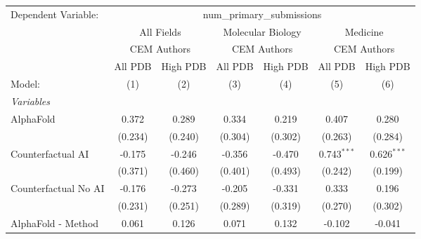 \begingroup
\centering
\begin{tabular}{lcccccc}
   \tabularnewline \midrule \midrule
   Dependent Variable: & \multicolumn{6}{c}{num\_primary\_submissions}\\
 & \multicolumn{2}{c}{All Fields} & \multicolumn{2}{c}{Molecular Biology} & \multicolumn{2}{c}{Medicine} \\
\cmidrule(lr){2-3} \cmidrule(lr){4-5} \cmidrule(lr){6-7}
 & \multicolumn{2}{c}{CEM Authors} & \multicolumn{2}{c}{CEM Authors} & \multicolumn{2}{c}{CEM Authors} \\
\cmidrule(lr){2-3} \cmidrule(lr){4-5} \cmidrule(lr){6-7}
 & \multicolumn{1}{c}{All PDB} & \multicolumn{1}{c}{High PDB} & \multicolumn{1}{c}{All PDB} & \multicolumn{1}{c}{High PDB} & \multicolumn{1}{c}{All PDB} & \multicolumn{1}{c}{High PDB} \\
\cmidrule(lr){2-2} \cmidrule(lr){3-3} \cmidrule(lr){4-4} \cmidrule(lr){5-5} \cmidrule(lr){6-6} \cmidrule(lr){7-7}
   Model:                                                     & (1)           & (2)           & (3)           & (4)           & (5)            & (6)\\  
   \midrule
   \emph{Variables}\\
   AlphaFold                                                  & 0.372         & 0.289         & 0.334         & 0.219         & 0.407          & 0.280\\   
                                                              & (0.234)       & (0.240)       & (0.304)       & (0.302)       & (0.263)        & (0.284)\\   
   Counterfactual AI                                          & -0.175        & -0.246        & -0.356        & -0.470        & 0.743$^{***}$  & 0.626$^{***}$\\   
                                                              & (0.371)       & (0.460)       & (0.401)       & (0.493)       & (0.242)        & (0.199)\\   
   Counterfactual No AI                                       & -0.176        & -0.273        & -0.205        & -0.331        & 0.333          & 0.196\\   
                                                              & (0.231)       & (0.251)       & (0.289)       & (0.319)       & (0.270)        & (0.302)\\   
   AlphaFold - Method                                         & 0.061         & 0.126         & 0.071         & 0.132         & -0.102         & -0.041\\   

\end{tabular}
